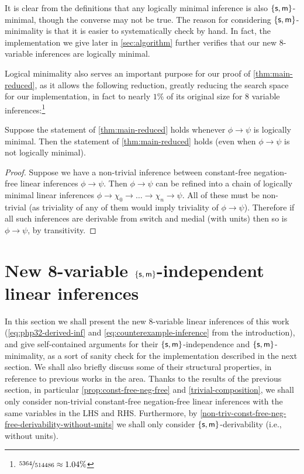 \documentclass[a4paper, UKenglish, cleveref]{lipics-v2019}
\begin{document}
It is clear from the definitions that any logically minimal inference is also \(\{\mathsf{s},\mathsf{m}\}\)-minimal, though the converse may not be true.
The reason for considering \(\{\mathsf{s},\mathsf{m}\}\)-minimality is that it is easier to systematically check by hand.
In fact, the implementation we give later in \cref{sec:algorithm} further verifies that our new $8$-variable inferences are logically minimal.


Logical minimality also serves an important purpose for our proof of \cref{thm:main-reduced}, as it allows the following reduction, greatly reducing the search space for our implementation, in fact to nearly $1\%$ of its original size for \(8\) variable inferences:\footnote{\(\nicefrac{5364}{514486} \approx 1.04\%\)}

\begin{lemma}\label{lem:minimality}
  Suppose the statement of \cref{thm:main-reduced} holds whenever \(\phi \to \psi\) is logically minimal. Then the statement of \cref{thm:main-reduced} holds (even when \(\phi \to \psi\) is not logically minimal).
\end{lemma}
\begin{proof}
  Suppose we have a non-trivial inference between constant-free negation-free linear inferences \(\phi \to \psi\). Then \(\phi \to \psi\) can be refined into a chain of logically minimal linear inferences \(\phi \to \chi_0 \to \dots \to \chi_n \to \psi\). All of these must be non-trivial (as triviality of any of them would imply triviality of \(\phi \to \psi\)). Therefore if all such inferences are derivable from switch and medial (with units) then so is \(\phi \to \psi\), by transitivity.
\end{proof}

\section{New 8-variable $\{\mathsf{s},\mathsf{m}\}$-independent linear inferences}
\label{sec:8var-inf}
In this section we shall present the new 8-variable linear inferences of this work (\eqref{eq:php32-derived-inf} and \eqref{eq:counterexample-inference} from the introduction), and give self-contained arguments for their $\{\mathsf{s},\mathsf{m}\}$-independence and $\{\mathsf{s},\mathsf{m}\}$-minimality, as a sort of sanity check for the implementation described in the next section.
We shall also briefly discuss some of their structural properties, in reference to previous works in the area.
Thanks to the results of the previous section, in particular \cref{prop:const-free-neg-free} and \cref{trivial-composition}, we shall only consider non-trivial constant-free negation-free linear inferences with the same variables in the LHS and RHS.
Furthermore, by \cref{non-triv-const-free-neg-free-derivability-without-units} we shall only consider $\{\mathsf{s},\mathsf{m} \}$-derivability (i.e., without units).
\end{document}
